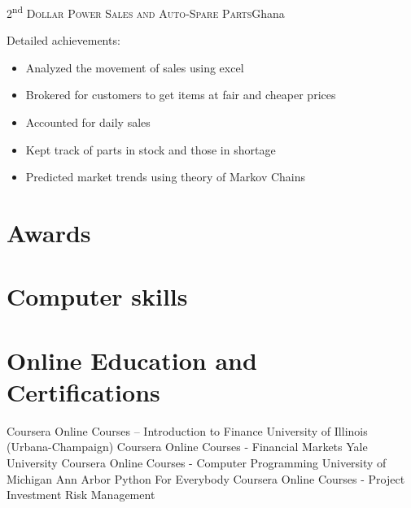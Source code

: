 \documentclass[11pt,a4paper,sans]{moderncv}\usepackage[]{graphicx}\usepackage[]{xcolor}
\begin{document}
{2\textsuperscript{nd}}
{\textsc{Dollar Power Sales and Auto-Spare Parts}}{Ghana}
{}{
Detailed achievements:
\begin{itemize}
\item 	Analyzed the movement of sales using excel
\item 	Brokered for customers to get items at fair and cheaper prices
\item 	Accounted for daily sales
\item 	Kept track of parts in stock and those in shortage
\item 	Predicted market trends using theory of Markov Chains
\end{itemize}}

\section{Awards}


\section{Computer skills}



\section{Online Education and Certifications}
{Coursera Online Courses – Introduction to Finance
 University of Illinois (Urbana-Champaign)}
{Coursera Online Courses - Financial Markets
Yale University}
{Coursera Online Courses - Computer Programming
University of Michigan Ann Arbor
Python For Everybody}
{Coursera Online Courses - Project
Investment Risk Management}
\end{document}
